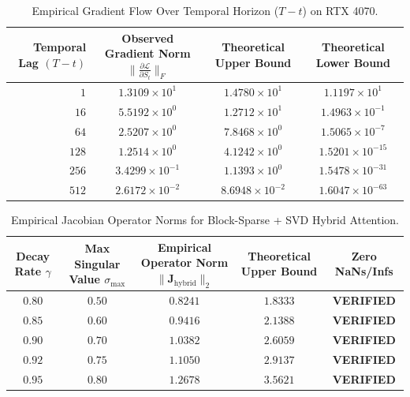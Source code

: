 \documentclass[journal]{IEEEtran}
\begin{document}
\begin{table}[h]
\centering
\caption{Empirical Gradient Flow Over Temporal Horizon ($T-t$) on RTX 4070.}
\label{tab:gradient_flow_empirical}
\begin{tabular}{rccc}
\toprule
\textbf{Temporal Lag} $(T - t)$ & \textbf{Observed Gradient Norm} $\|\frac{\partial \mathcal{L}}{\partial S_t}\|_F$ & \textbf{Theoretical Upper Bound} & \textbf{Theoretical Lower Bound} \\
\midrule
$1$ & $1.3109 \times 10^{1}$ & $1.4780 \times 10^{1}$ & $1.1197 \times 10^{1}$ \\
$16$ & $5.5192 \times 10^{0}$ & $1.2712 \times 10^{1}$ & $1.4963 \times 10^{-1}$ \\
$64$ & $2.5207 \times 10^{0}$ & $7.8468 \times 10^{0}$ & $1.5065 \times 10^{-7}$ \\
$128$ & $1.2514 \times 10^{0}$ & $4.1242 \times 10^{0}$ & $1.5201 \times 10^{-15}$ \\
$256$ & $3.4299 \times 10^{-1}$ & $1.1393 \times 10^{0}$ & $1.5478 \times 10^{-31}$ \\
$512$ & $2.6172 \times 10^{-2}$ & $8.6948 \times 10^{-2}$ & $1.6047 \times 10^{-63}$ \\
\bottomrule
\end{tabular}
\end{table}

\begin{table}[h]
\centering
\caption{Empirical Jacobian Operator Norms for Block-Sparse + SVD Hybrid Attention.}
\label{tab:hybrid_jacobian_stability}
\begin{tabular}{ccccc}
\toprule
\textbf{Decay Rate} $\gamma$ & \textbf{Max Singular Value} $\sigma_{\max}$ & \textbf{Empirical Operator Norm} $\|\mathbf{J}_{\text{hybrid}}\|_2$ & \textbf{Theoretical Upper Bound} & \textbf{Zero NaNs/Infs} \\
\midrule
$0.80$ & $0.50$ & $0.8241$ & $1.8333$ & \textbf{VERIFIED} \\
$0.85$ & $0.60$ & $0.9416$ & $2.1388$ & \textbf{VERIFIED} \\
$0.90$ & $0.70$ & $1.0382$ & $2.6059$ & \textbf{VERIFIED} \\
$0.92$ & $0.75$ & $1.1050$ & $2.9137$ & \textbf{VERIFIED} \\
$0.95$ & $0.80$ & $1.2678$ & $3.5621$ & \textbf{VERIFIED} \\
\bottomrule
\end{tabular}
\end{table}
\end{document}
